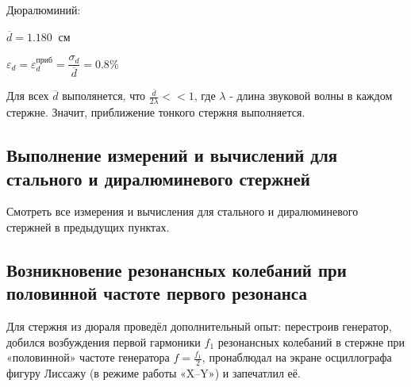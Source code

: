\documentclass[a4paper]{article}
\begin{document}
\item Дюралюминий:
\item $\overline{d} = 1.180 \ $ см
\item $\varepsilon_d = \varepsilon_{d}^\text{приб} = \dfrac{\sigma_d}{\overline{d}} = 0.8\%$
\item

\item Для всех $\overline{d}$ выполянется, что $\frac{\overline{d}}{2\lambda} << 1$, где $\lambda$ - длина звуковой волны в каждом стержне. Значит, приближение тонкого стержня выполняется.


\subsection{Выполнение измерений и вычислений для стального и диралюминевого стержней}

\item Смотреть все измерения и вычисления для стального и диралюминевого стержней в предыдущих пунктах.



\subsection{Возникновение резонансных колебаний при половинной частоте первого резонанса}

\item Для стержня из дюраля проведёл дополнительный опыт: перестроив генератор, добился возбуждения первой гармоники $f_1$ резонансных
колебаний в стержне при «половинной» частоте генератора $f = \frac{f_1}{2}$, пронаблюдал на экране осциллографа фигуру Лиссажу (в режиме работы
«X–Y») и запечатлил её.
\end{document}
